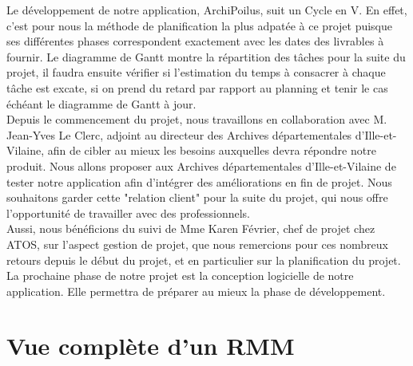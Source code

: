 \documentclass[a4paper]{article}
\begin{document}
	Le développement de notre application, ArchiPoilus, suit un Cycle en V. En effet, c'est pour nous la méthode de planification la plus adpatée à ce projet puisque ses différentes phases correspondent exactement avec les dates des livrables à fournir. Le diagramme de Gantt montre la répartition des tâches pour la suite du projet, il faudra ensuite vérifier si l'estimation du temps à consacrer à chaque tâche est excate, si on prend du retard par rapport au planning et tenir le cas échéant le diagramme de Gantt à jour.\\
	
	Depuis le commencement du projet, nous travaillons en collaboration avec M. Jean-Yves Le Clerc, adjoint au directeur des Archives départementales d’Ille-et-Vilaine, afin de cibler au mieux les besoins auxquelles devra répondre notre produit. Nous allons proposer aux Archives départementales d’Ille-et-Vilaine de tester notre application afin d'intégrer des améliorations en fin de projet. Nous souhaitons garder cette "relation client"  pour la suite du projet, qui nous offre l’opportunité de travailler avec des professionnels.\\
	
	Aussi, nous bénéficions du suivi de Mme Karen Février, chef de projet chez ATOS, sur l’aspect gestion de projet, que nous remercions pour ces nombreux retours depuis le début du projet, et en particulier sur la planification du projet.\\
	
	La prochaine phase de notre projet est la conception logicielle de notre application. Elle permettra de préparer au mieux la phase de développement.

\appendix

\section{Vue compl\`ete d'un RMM}
\label{sec:annexe 1}
\end{document}
